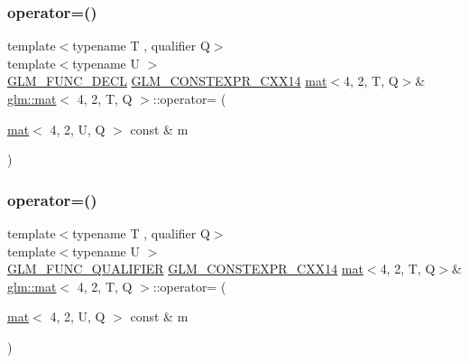 \mbox{\label{structglm_1_1mat_3_014_00_012_00_01_t_00_01_q_01_4_a40494ccea0b2ac5816c33779b9e25d74}} 
\subsubsection{\texorpdfstring{operator=()}{operator=()}\hspace{0.1cm}{\footnotesize\ttfamily [2/3]}}
{\footnotesize\ttfamily template$<$typename T , qualifier Q$>$ \\
template$<$typename U $>$ \\
\mbox{\hyperlink{setup_8hpp_ab2d052de21a70539923e9bcbf6e83a51}{G\+L\+M\+\_\+\+F\+U\+N\+C\+\_\+\+D\+E\+CL}} \mbox{\hyperlink{setup_8hpp_a4dd12abf5e1164bc57f3a34671d03844}{G\+L\+M\+\_\+\+C\+O\+N\+S\+T\+E\+X\+P\+R\+\_\+\+C\+X\+X14}} \mbox{\hyperlink{structglm_1_1mat}{mat}}$<$4, 2, T, Q$>$\& \mbox{\hyperlink{structglm_1_1mat}{glm\+::mat}}$<$ 4, 2, T, Q $>$\+::operator= (\begin{DoxyParamCaption}\item[{\mbox{\hyperlink{structglm_1_1mat}{mat}}$<$ 4, 2, U, Q $>$ const \&}]{m }\end{DoxyParamCaption})}

\mbox{\label{structglm_1_1mat_3_014_00_012_00_01_t_00_01_q_01_4_a5a19a58d4bc0772518b210e63aa86e7f}} 
\subsubsection{\texorpdfstring{operator=()}{operator=()}\hspace{0.1cm}{\footnotesize\ttfamily [3/3]}}
{\footnotesize\ttfamily template$<$typename T , qualifier Q$>$ \\
template$<$typename U $>$ \\
\mbox{\hyperlink{setup_8hpp_a33fdea6f91c5f834105f7415e2a64407}{G\+L\+M\+\_\+\+F\+U\+N\+C\+\_\+\+Q\+U\+A\+L\+I\+F\+I\+ER}} \mbox{\hyperlink{setup_8hpp_a4dd12abf5e1164bc57f3a34671d03844}{G\+L\+M\+\_\+\+C\+O\+N\+S\+T\+E\+X\+P\+R\+\_\+\+C\+X\+X14}} \mbox{\hyperlink{structglm_1_1mat}{mat}}$<$4, 2, T, Q$>$\& \mbox{\hyperlink{structglm_1_1mat}{glm\+::mat}}$<$ 4, 2, T, Q $>$\+::operator= (\begin{DoxyParamCaption}\item[{\mbox{\hyperlink{structglm_1_1mat}{mat}}$<$ 4, 2, U, Q $>$ const \&}]{m }\end{DoxyParamCaption})}



